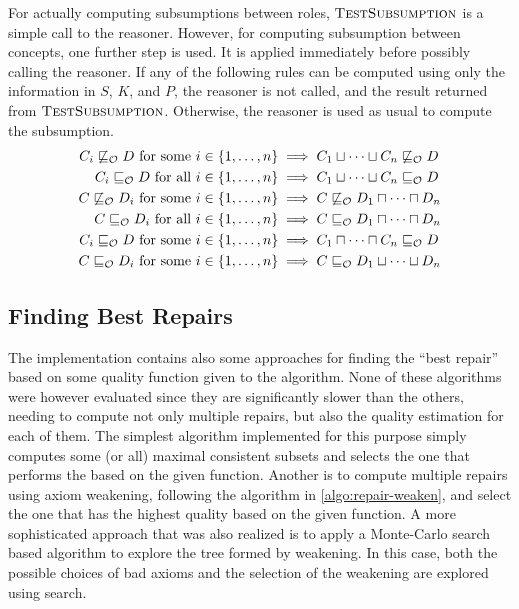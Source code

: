 For actually computing subsumptions between roles, $\textsc{TestSubsumption}$ is a simple call to the reasoner. However, for computing subsumption between concepts, one further step is used. It is applied immediately before possibly calling the reasoner. If any of the following rules can be computed using only the information in $S$, $K$, and $P$, the reasoner is not called, and the result returned from $\textsc{TestSubsumption}$. Otherwise, the reasoner is used as usual to compute the subsumption.
\begin{align*}
  C_i \not\sqsubseteq_\mathcal{O} D \text{ for some } i \in \{ 1, \dots, n \} &\implies C_1 \sqcup \cdots \sqcup C_n \not\sqsubseteq_\mathcal{O} D \\
  C_i \sqsubseteq_\mathcal{O} D \text{ for all } i \in \{ 1, \dots, n \} &\implies C_1 \sqcup \cdots \sqcup C_n \sqsubseteq_\mathcal{O} D \\
  C \not\sqsubseteq_\mathcal{O} D_i \text{ for some } i \in \{ 1, \dots, n \} &\implies C \not\sqsubseteq_\mathcal{O} D_1 \sqcap \cdots \sqcap D_n \\
  C \sqsubseteq_\mathcal{O} D_i \text{ for all } i \in \{ 1, \dots, n \} &\implies C \sqsubseteq_\mathcal{O} D_1 \sqcap \cdots \sqcap D_n \\
  C_i \sqsubseteq_\mathcal{O} D \text{ for some } i \in \{ 1, \dots, n \} &\implies C_1 \sqcap \dots \sqcap C_n \sqsubseteq_\mathcal{O} D \\
  C \sqsubseteq_\mathcal{O} D_i \text{ for some } i \in \{ 1, \dots, n \} &\implies C \sqsubseteq_\mathcal{O} D_1 \sqcup \cdots \sqcup D_n \\
\end{align*}

\subsection{Finding Best Repairs}\label{best-repair-impl}

The implementation contains also some approaches for finding the ``best repair'' based on some quality function given to the algorithm. None of these algorithms were however evaluated since they are significantly slower than the others, needing to compute not only multiple repairs, but also the quality estimation for each of them. The simplest algorithm implemented for this purpose simply computes some (or all) maximal consistent subsets and selects the one that performs the based on the given function. Another is to compute multiple repairs using axiom weakening, following the algorithm in \cref{algo:repair-weaken}, and select the one that has the highest quality based on the given function. A more sophisticated approach that was also realized is to apply a Monte-Carlo search \cite{coulom2006efficient} based algorithm to explore the tree formed by weakening. In this case, both the possible choices of bad axioms and the selection of the weakening are explored using search.

